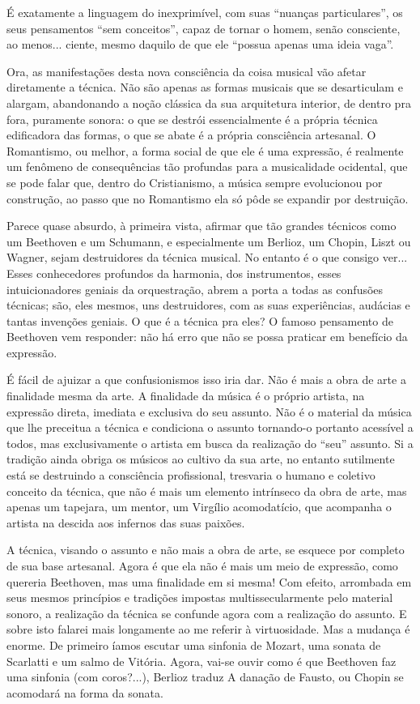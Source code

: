 É exatamente a linguagem do inexprimível, com suas ``nuanças
particulares'', os seus pensamentos ``sem conceitos'', capaz de tornar o
homem, senão consciente, ao menos... ciente, mesmo daquilo de que ele
``possua apenas uma ideia vaga''.

Ora, as manifestações desta nova consciência da coisa musical vão afetar
diretamente a técnica. Não são apenas as formas musicais que se
desarticulam e alargam, abandonando a noção clássica da sua arquitetura
interior, de dentro pra fora, puramente sonora: o que se destrói
essencialmente é a própria técnica edificadora das formas, o que se
abate é a própria consciência artesanal. O Romantismo, ou melhor, a
forma social de que ele é uma expressão, é realmente um fenômeno de
consequências tão profundas para a musicalidade ocidental, que se pode
falar que, dentro do Cristianismo, a música sempre evolucionou por
construção, ao passo que no Romantismo ela só pôde se expandir por
destruição.

Parece quase absurdo, à primeira vista, afirmar que tão grandes técnicos
como um Beethoven e um Schumann, e especialmente um Berlioz, um Chopin,
Liszt ou Wagner, sejam destruidores da técnica musical. No entanto é o
que consigo ver... Esses conhecedores profundos da harmonia, dos
instrumentos, esses intuicionadores geniais da orquestração, abrem a
porta a todas as confusões técnicas; são, eles mesmos, uns destruidores,
com as suas experiências, audácias e tantas invenções geniais. O que é a
técnica pra eles? O famoso pensamento de Beethoven vem responder: não há
erro que não se possa praticar em benefício da expressão.

É fácil de ajuizar a que confusionismos isso iria dar. Não é mais a obra
de arte a finalidade mesma da arte. A finalidade da música é o próprio
artista, na expressão direta, imediata e exclusiva do seu assunto. Não é
o material da música que lhe preceitua a técnica e condiciona o assunto
tornando-o portanto acessível a todos, mas exclusivamente o artista em
busca da realização do ``seu'' assunto. Si a tradição ainda obriga os
músicos ao cultivo da sua arte, no entanto sutilmente está se destruindo
a consciência profissional, tresvaria o humano e coletivo conceito da
técnica, que não é mais um elemento intrínseco da obra de arte, mas
apenas um tapejara, um mentor, um Virgílio acomodatício, que acompanha o
artista na descida aos infernos das suas paixões.

A técnica, visando o assunto e não mais a obra de arte, se esquece por
completo de sua base artesanal. Agora é que ela não é mais um meio de
expressão, como quereria Beethoven, mas uma finalidade em si mesma! Com
efeito, arrombada em seus mesmos princípios e tradições impostas
multissecularmente pelo material sonoro, a realização da técnica se
confunde agora com a realização do assunto. E sobre isto falarei mais
longamente ao me referir à virtuosidade. Mas a mudança é enorme. De
primeiro íamos escutar uma sinfonia de Mozart, uma sonata de Scarlatti e
um salmo de Vitória. Agora, vai-se ouvir como é que Beethoven faz uma
sinfonia (com coros?...), Berlioz traduz A danação de Fausto, ou Chopin
se acomodará na forma da sonata.

